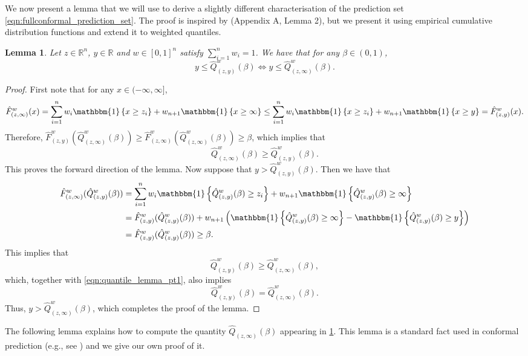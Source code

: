 \documentclass[11pt, titlepage]{article} %
\newcommand{\Ind}[1]{\mathbbm{1}\left\{ #1 \right\}}
\numberwithin{equation}{section}
\newtheorem{lemma}{Lemma}
\theoremstyle{definition}
\numberwithin{theorem}{section}
\numberwithin{lemma}{section}
\numberwithin{corollary}{section}
\numberwithin{proposition}{section}
\numberwithin{definition}{section}
\numberwithin{remark}{section}
\begin{document}
\noindent
We now present a lemma that we will use to derive a slightly different characterisation of the prediction set \eqref{eqn:fullconformal_prediction_set}. The proof is inspired by \cite{romano2019_CQR} (Appendix A, Lemma 2), but we present it using empirical cumulative distribution functions and extend it to weighted quantiles.

\begin{lemma}
    Let \(z \in \mathbb{R}^n\), \(y \in \mathbb{R}\) and \(w \in [0,1]^n\) satisfy \(\sum_{i=1}^n w_i = 1\). We have that for any \(\beta \in (0,1)\), \[y \leq \hat{Q}^w_{(z,y)}(\beta) \iff y \leq \hat{Q}^w_{(z,\infty)}(\beta).\]
\label{lemma:quantile_lemma}
\end{lemma}
\begin{proof}
    First note that for any \(x \in (-\infty, \infty]\), \[
        \hat{F}^w_{(z,\infty)}(x) = \sum_{i=1}^n w_i \Ind{x \geq z_i} + w_{n+1} \Ind{x \geq \infty} \leq \sum_{i=1}^n w_i \Ind{x \geq z_i} + w_{n+1} \Ind{x \geq y} = \hat{F}^w_{(z,y)}(x).
    \] Therefore, \(\hat{F}^w_{(z,y)}(\hat{Q}^w_{(z, \infty)}(\beta)) \geq \hat{F}^w_{(z,\infty)}(\hat{Q}^w_{(z, \infty)}(\beta)) \geq \beta\), which implies that \begin{equation}
        \hat{Q}^w_{(z, \infty)}(\beta) \geq \hat{Q}^w_{(z, y)}(\beta).
    \label{eqn:quantile_lemma_pt1}
    \end{equation} This proves the forward direction of the lemma. Now suppose that \(y > \hat{Q}^w_{(z,y)}(\beta).\) Then we have that \begin{align*}
        \hat{F}^w_{(z,\infty)}(\hat{Q}^w_{(z, y)}(\beta)) &= \sum_{i=1}^n w_i \Ind{\hat{Q}^w_{(z, y)}(\beta) \geq z_i} + w_{n+1} \Ind{\hat{Q}^w_{(z, y)}(\beta) \geq \infty} \\
        &= \hat{F}^w_{(z,y)}(\hat{Q}^w_{(z, y)}(\beta)) + w_{n+1} \left( \Ind{\hat{Q}^w_{(z, y)}(\beta) \geq \infty} - \Ind{\hat{Q}^w_{(z, y)}(\beta) \geq y} \right) \\
        &= \hat{F}^w_{(z,y)}(\hat{Q}^w_{(z, y)}(\beta)) \geq \beta.
    \end{align*} This implies that \[\hat{Q}^w_{(z, y)}(\beta) \geq \hat{Q}^w_{(z, \infty)}(\beta),\] which, together with \eqref{eqn:quantile_lemma_pt1}, also implies \[\hat{Q}^w_{(z, y)}(\beta) = \hat{Q}^w_{(z, \infty)}(\beta).\] Thus, \(y > \hat{Q}^w_{(z, \infty)}(\beta)\), which completes the proof of the lemma.
\end{proof}

\noindent
The following lemma explains how to compute the quantity \(\hat{Q}_{(z, \infty)}(\beta)\) appearing in \cref{lemma:quantile_lemma}. This lemma is a standard fact used in conformal prediction (e.g., see \cite{lei2018}) and we give our own proof of it.
\end{document}
